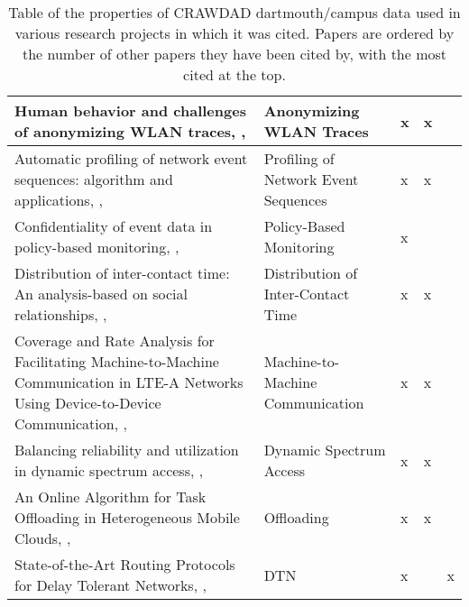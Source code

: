 \begin{table}
\begin{tabular}{|p{6.5cm}|p{2cm}|p{1.5cm}|p{1.5cm}|p{1.5cm}|}
Human behavior and challenges of anonymizing WLAN traces, \citeauthor{Kumar2009}, \citeyear{Kumar2009}         & Anonymizing WLAN Traces            & x                          & x                     &                            \\ \hline
Automatic profiling of network event sequences: algorithm and applications, \citeauthor{Meng2008}, \citeyear{Meng2008}           &Profiling of Network Event Sequences& x                          & x                     &                            \\ \hline
Confidentiality of event data in policy-based monitoring, \citeauthor{Montanari2012}, \citeyear{Montanari2012} & Policy-Based Monitoring            & x                          &                       &                            \\ \hline
Distribution of inter-contact time: An analysis-based on social relationships, \citeauthor{Wei2013}, \citeyear{Wei2013}             & Distribution of Inter-Contact Time & x                          & x                     &                            \\ \hline
Coverage and Rate Analysis for Facilitating Machine-to-Machine Communication in LTE-A Networks Using Device-to-Device Communication, \citeauthor{Swain2017}, \citeyear{Swain2017}         & Machine-to-Machine Communication   & x                          & x                     &                            \\ \hline
Balancing reliability and utilization in dynamic spectrum access, \citeauthor{Cao2012}, \citeyear{Cao2012}             & Dynamic Spectrum Access            & x                          & x                     &                            \\ \hline
An Online Algorithm for Task Offloading in Heterogeneous Mobile Clouds, \citeauthor{Zhou2018}, \citeyear{Zhou2018}           & Offloading                         & x                          & x                     &                            \\ \hline
State-of-the-Art Routing Protocols for Delay Tolerant Networks, \citeauthor{Feng2012}, \citeyear{Feng2012}          & DTN                                 & x                          &                       & x                          \\ \hline

\end{tabular}
\caption{Table of the properties of CRAWDAD dartmouth/campus data used in various research projects in which it was cited. Papers are ordered by the number of other papers they have been cited by, with the most cited at the top.}
\label{usageTable}
\end{table}